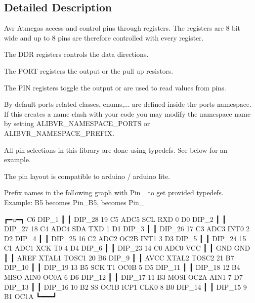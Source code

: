 \subsection{Detailed Description}
Avr Atmegas access and control pins through registers. The registers are 8 bit wide and up to 8 pins are therefore controlled with every register. 


\begin{DoxyItemize}
\item The D\+DR registers controls the data directions.
\item The P\+O\+RT registers the output or the pull up resistors.
\item The P\+IN registers toggle the output or are used to read values from pins.
\end{DoxyItemize}

By default ports related classes, enums,... are defined inside the {\ttfamily ports} namespace. If this creates a name clash with your code you may modify the namespace name by setting A\+L\+I\+B\+V\+R\+\_\+\+N\+A\+M\+E\+S\+P\+A\+C\+E\+\_\+\+P\+O\+R\+TS or A\+L\+I\+B\+V\+R\+\_\+\+N\+A\+M\+E\+S\+P\+A\+C\+E\+\_\+\+P\+R\+E\+F\+IX.

All pin selections in this library are done using {\ttfamily typedef}s. See below for an example.

The pin layout is compatible to arduino / arduino lite.

Prefix names in the following graph with {\ttfamily Pin\+\_\+} to get provided {\ttfamily typedef}s. Example\+: {\ttfamily B5} becomes {\ttfamily Pin\+\_\+\+B5}, {} becomes {\ttfamily Pin\+\_}


\begin{DoxyCode}
                                 ┏━u━┓
                     C6    DIP\_1 ┃   ┃ DIP\_28   19   C5   ADC5   SCL
RXD              0   D0    DIP\_2 ┃   ┃ DIP\_27   18   C4   ADC4   SDA
TXD              1   D1    DIP\_3 ┃   ┃ DIP\_26   17   C3   ADC3
        INT0     2   D2    DIP\_4 ┃   ┃ DIP\_25   16   C2   ADC2
OC2B    INT1     3   D3    DIP\_5 ┃   ┃ DIP\_24   15   C1   ADC1
XCK     T0       4   D4    DIP\_6 ┃   ┃ DIP\_23   14   C0   ADC0
                             VCC ┃   ┃ GND
                             GND ┃   ┃ AREF
XTAL1   TOSC1   20   B6    DIP\_9 ┃   ┃ AVCC
XTAL2   TOSC2   21   B7   DIP\_10 ┃   ┃ DIP\_19   13   B5   SCK
T1      OC0B     5   D5   DIP\_11 ┃   ┃ DIP\_18   12   B4   MISO
AIN0    OC0A     6   D6   DIP\_12 ┃   ┃ DIP\_17   11   B3   MOSI   OC2A
AIN1             7   D7   DIP\_13 ┃   ┃ DIP\_16   10   B2   SS     OC1B
ICP1    CLK0     8   B0   DIP\_14 ┃   ┃ DIP\_15    9   B1          OC1A
                                 ┗━━━┛
\end{DoxyCode}
 

